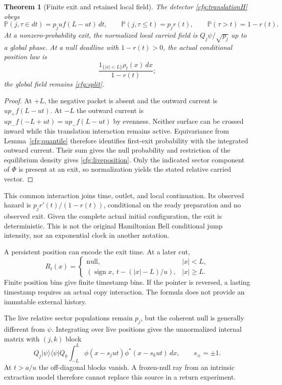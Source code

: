 \documentclass[11pt,oneside,openany]{book}
\newtheorem{theorem}{Theorem}[chapter]
\theoremstyle{definition}
\theoremstyle{remark}\newtheorem{remark}[theorem]{Remark}
\begin{document}
\begin{theorem}[Finite exit and retained local field]\label{cfg:exit}
The detector \eqref{cfg:translationH} obeys
\begin{equation}
 \mathbb P(j,\tau\in dt)=p_j u f(L-ut)\,dt,\qquad
 \mathbb P(j,\tau\le t)=p_jr(t),\qquad
 \mathbb P(\tau>t)=1-r(t).
 \label{cfg:exitlaw}
\end{equation}
At a nonzero-probability exit, the normalized local carried field is
$Q_j\psi/\sqrt{p_j}$ up to a global phase. At a null deadline with
$1-r(t)>0$, the actual conditional position law is
\begin{equation}
 \frac{1_{\{|x|<L\}}\rho_t(x)\,dx}{1-r(t)};
 \label{cfg:liveposition}
\end{equation}
the global field remains \eqref{cfg:split}.
\end{theorem}
\begin{proof}
At $+L$, the negative packet is absent and the outward current is
$up_+f(L-ut)$. At $-L$ the outward current is
$up_-f(-L+ut)=up_-f(L-ut)$ by evenness. Neither surface can be crossed
inward while this translation interaction remains active. Equivariance from
Lemma~\ref{cfg:quantile} therefore identifies first-exit probability with
the integrated outward current. Their sum gives the null probability and
restriction of the equilibrium density gives \eqref{cfg:liveposition}.
Only the indicated sector component of $\Phi$ is present at an exit,
so normalization yields the stated relative carried vector.
\end{proof}

This common interaction joins time, outlet, and local continuation.
Its observed hazard is
$p_jr'(t)/(1-r(t))$, conditional on the ready preparation and no observed
exit. Given the complete actual initial configuration, the exit is
deterministic. This is not the original Hamiltonian Bell conditional
jump intensity, nor an exponential clock in another notation.

A persistent position can encode the exit time. At a later cut,
\[
 R_t(x)=
 \begin{cases}
 \mathrm{null},&|x|<L,\\
 (\operatorname{sign}x,\ t-(|x|-L)/u),&|x|\ge L.
 \end{cases}
\]
Finite position bins give finite timestamp bins. If the pointer is reversed,
a lasting timestamp requires an actual copy interaction. The formula does
not provide an immutable external history.

The live relative sector populations remain $p_j$, but the coherent null
is generally different from $\psi$. Integrating over live positions gives
the unnormalized internal matrix with $(j,k)$ block
\[
 Q_j|\psi\rangle\langle\psi|Q_k
 \int_{-L}^L\phi(x-s_jut)\phi^*(x-s_kut)\,dx,
 \qquad s_\pm=\pm1.
\]
At $t>a/u$ the off-diagonal blocks vanish. A frozen-null ray from an
intrinsic extraction model therefore cannot replace this source in a return
experiment.
\end{document}
